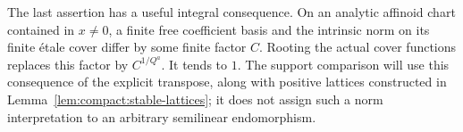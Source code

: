 The last assertion has a useful integral consequence.
On an analytic affinoid chart contained in $x\ne0$,
a finite free coefficient basis and the intrinsic
norm on its finite \'etale cover differ by some
finite factor $C$.  Rooting the actual cover
functions replaces this factor by $C^{1/Q^a}$.
It tends to $1$.  The support comparison will use
this consequence of the explicit transpose, along
with positive lattices constructed in
Lemma~\ref{lem:compact:stable-lattices}; it does
not assign such a norm interpretation to an
arbitrary semilinear endomorphism.
